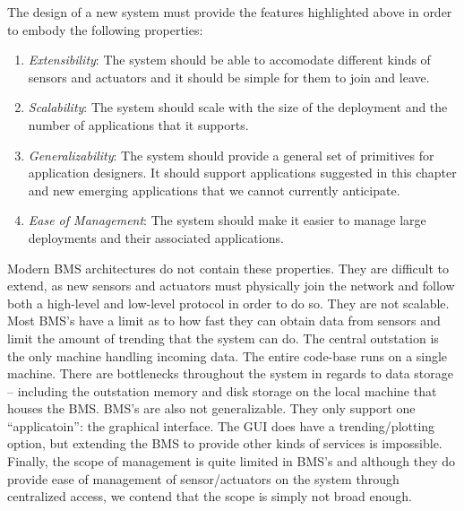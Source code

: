 
The design of a new system must provide the features highlighted above in order to embody the following properties:

\begin{enumerate}

\item \emph{Extensibility}:  The system should be able to accomodate different kinds of sensors and actuators and it should
be simple for them to join and leave.

\item \emph{Scalability}:  The system should scale with the size of the deployment and the number of applications that it supports.

\item \emph{Generalizability}:  The system should provide a general set of primitives for application designers.  It should support applications
suggested in this chapter and new emerging applications that we cannot currently anticipate.

\item \emph{Ease of Management}: The system should make it easier to manage large deployments and their associated applications.

\end{enumerate}

Modern BMS architectures do not contain these properties.  They are difficult to extend, as new sensors and actuators must physically join 
the network and follow both a high-level and low-level protocol in order to do so.  They are not scalable.  Most BMS's have a limit as to
how fast they can obtain data from sensors and limit the amount of trending that the system can do.  The central outstation is the only
machine handling incoming data.  The entire code-base runs on a single machine.  There are bottlenecks throughout the system in regards to
data storage -- including the outstation memory and disk storage on the local machine that houses the BMS.  BMS's are also not generalizable.
They only support one ``applicatoin'': the graphical interface.  The GUI does have a trending/plotting option, but extending the BMS
to provide other kinds of services is impossible.  Finally, the scope of management is quite limited in BMS's and although they do provide
ease of management of sensor/actuators on the system through centralized access, we contend that the scope is simply not broad enough.


